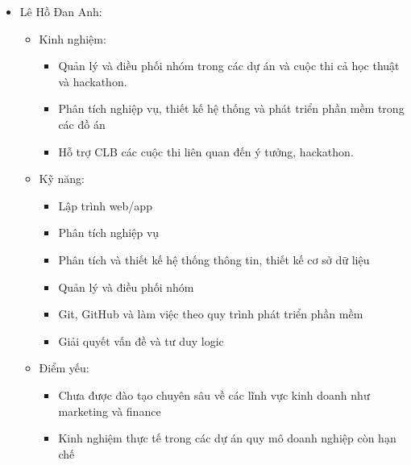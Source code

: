 \begin{itemize}
    \item Lê Hồ Đan Anh:
    \begin{itemize}
        \item Kinh nghiệm:
            \begin{itemize}
                \item Quản lý và điều phối nhóm trong các dự án và cuộc thi cả học thuật và hackathon.
                \item Phân tích nghiệp vụ, thiết kế hệ thống và phát triển phần mềm trong các đồ án
                \item Hỗ trợ CLB các cuộc thi liên quan đến ý tưởng, hackathon.
            \end{itemize}
        \item Kỹ năng:
            \begin{itemize}
                \item Lập trình web/app
                \item Phân tích nghiệp vụ
                \item Phân tích và thiết kế hệ thống thông tin, thiết kế cơ sở dữ liệu
                \item Quản lý và điều phối nhóm
                \item Git, GitHub và làm việc theo quy trình phát triển phần mềm
                \item Giải quyết vấn đề và tư duy logic
            \end{itemize}
        \item Điểm yếu:
            \begin{itemize}
                \item Chưa được đào tạo chuyên sâu về các lĩnh vực kinh doanh như marketing và finance
                \item Kinh nghiệm thực tế trong các dự án quy mô doanh nghiệp còn hạn chế
            \end{itemize}
    \end{itemize}


\end{itemize}
